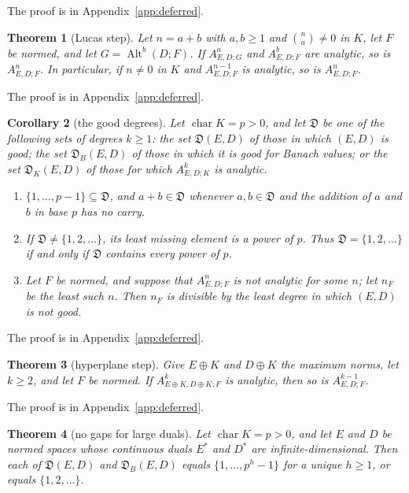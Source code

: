 \documentclass[11pt]{amsart}
\newtheorem{theorem}{Theorem}[section]
\newtheorem{corollary}[theorem]{Corollary}
\theoremstyle{definition}
\theoremstyle{remark}
\numberwithin{equation}{section}
\newcommand{\Alt}{\operatorname{Alt}}
\theoremstyle{plain}
\theoremstyle{definition}
\theoremstyle{plain}
\newcommand{\fD}{\mathfrak D}
\begin{document}
The proof is in Appendix~\ref{app:deferred}.

\begin{theorem}[Lucas step]\label{fib:thm:lucas}
Let $n=a+b$ with $a,b\ge1$ and $\binom na\ne0$ in $K$, let $F$ be normed, and let $G=\Alt^b(D;F)$. If
$A^a_{E,D;G}$ and $A^b_{E,D;F}$ are analytic, so is $A^n_{E,D;F}$. In particular, if $n\ne0$ in $K$ and
$A^{n-1}_{E,D;F}$ is analytic, so is $A^n_{E,D;F}$.
\end{theorem}

The proof is in Appendix~\ref{app:deferred}.

\begin{corollary}[the good degrees]\label{fib:cor:degrees}
Let $\operatorname{char}K=p>0$, and let $\fD$ be one of the following sets of degrees $k\ge1$: the set $\fD(E,D)$ of
those in which $(E,D)$ is good; the set $\fD_B(E,D)$ of those in which it is good for Banach values; or the set
$\fD_K(E,D)$ of those for which $A^k_{E,D;K}$ is analytic.
\begin{enumerate}
\item $\{1,\dots,p-1\}\subseteq\fD$, and $a+b\in\fD$ whenever $a,b\in\fD$ and the addition of $a$
and $b$ in base $p$ has no carry.
\item If $\fD\ne\{1,2,\dots\}$, its least missing element is a power of $p$. Thus
$\fD=\{1,2,\dots\}$ if and only if $\fD$ contains every power of $p$.
\item Let $F$ be normed, and suppose that $A^n_{E,D;F}$ is not analytic for some $n$; let $n_F$ be the least such $n$.
Then $n_F$ is divisible by the least degree in which $(E,D)$ is not good.
\end{enumerate}
\end{corollary}

The proof is in Appendix~\ref{app:deferred}.

\begin{theorem}[hyperplane step]\label{fib:thm:hyperplane}
Give $E\oplus K$ and $D\oplus K$ the maximum norms, let $k\ge2$, and let $F$ be normed. If
$A^k_{E\oplus K,D\oplus K;F}$ is analytic, then so is $A^{k-1}_{E,D;F}$.
\end{theorem}

The proof is in Appendix~\ref{app:deferred}.

\begin{theorem}[no gaps for large duals]\label{cmb:thm:initial-segments}
Let $\operatorname{char}K=p>0$, and let $E$ and $D$ be normed spaces whose continuous duals $E^*$ and $D^*$ are
infinite-dimensional. Then each of $\fD(E,D)$ and $\fD_B(E,D)$ equals $\{1,\dots,p^h-1\}$ for a unique $h\ge1$, or
equals $\{1,2,\dots\}$.
\end{theorem}
\end{document}
